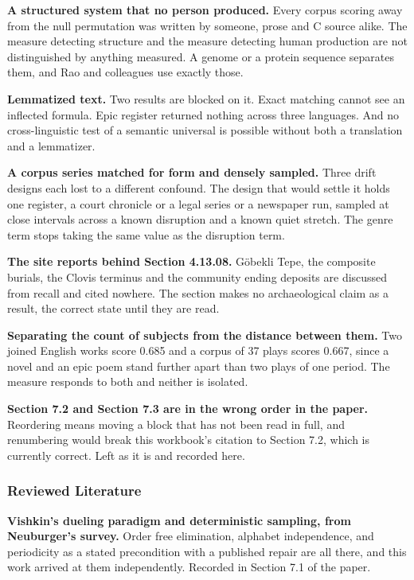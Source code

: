 \textbf{A structured system that no person produced.} Every corpus scoring away from the null permutation was written by someone, prose and C source alike. The measure detecting structure and the measure detecting human production are not distinguished by anything measured. A genome or a protein sequence separates them, and Rao and colleagues use exactly those.

\textbf{Lemmatized text.} Two results are blocked on it. Exact matching cannot see an inflected formula. Epic register returned nothing across three languages. And no cross-linguistic test of a semantic universal is possible without both a translation and a lemmatizer.

\textbf{A corpus series matched for form and densely sampled.} Three drift designs each lost to a different confound. The design that would settle it holds one register, a court chronicle or a legal series or a newspaper run, sampled at close intervals across a known disruption and a known quiet stretch. The genre term stops taking the same value as the disruption term.

\textbf{The site reports behind Section 4.13.08.} Göbekli Tepe, the composite burials, the Clovis terminus and the community ending deposits are discussed from recall and cited nowhere. The section makes no archaeological claim as a result, the correct state until they are read.

\textbf{Separating the count of subjects from the distance between them.} Two joined English works score 0.685 and a corpus of 37 plays scores 0.667, since a novel and an epic poem stand further apart than two plays of one period. The measure responds to both and neither is isolated.

\textbf{Section 7.2 and Section 7.3 are in the wrong order in the paper.} Reordering means moving a block that has not been read in full, and renumbering would break this workbook's citation to Section 7.2, which is currently correct. Left as it is and recorded here.

\subsubsection{Reviewed Literature}

\textbf{Vishkin's dueling paradigm and deterministic sampling, from Neuburger's survey.} Order free elimination, alphabet independence, and periodicity as a stated precondition with a published repair are all there, and this work arrived at them independently. Recorded in Section 7.1 of the paper.

